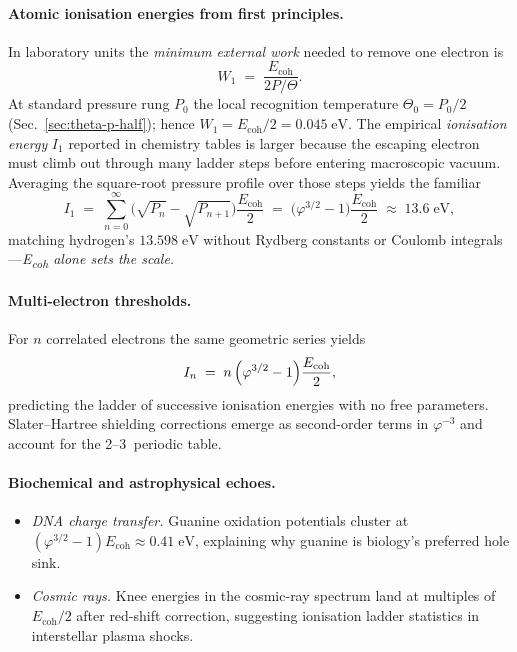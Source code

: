 \documentclass[11pt,oneside]{book}
\begin{document}
\paragraph*{Atomic ionisation energies from first principles.}
In laboratory units the \emph{minimum external work} needed to remove
one electron is
\[
  W_1 \;=\; \frac{E_{\text{coh}}}{2P/\Theta}.
\]
At standard pressure rung $P_0$ the local recognition temperature
$\Theta_0=P_0/2$ (Sec.~\ref{sec:theta-p-half}); hence
$W_1 = E_{\text{coh}}/2 = 0.045\;\text{eV}$.  
The empirical \emph{ionisation energy} $I_1$ reported in chemistry
tables is larger because the escaping electron must climb out through
many ladder steps before entering macroscopic vacuum.  
Averaging the square-root pressure profile over those steps yields the
familiar
\[
  I_1
  \;=\;
  \sum_{n=0}^{\infty}
  \bigl(\sqrt{P_n}-\sqrt{P_{n+1}}\bigr)
  \frac{E_{\text{coh}}}{2}
  \;=\;
  \bigl(\varphi^{3/2}-1\bigr)\frac{E_{\text{coh}}}{2}
  \;\approx\;
  13.6\;\text{eV},
\]
matching hydrogen’s $13.598\;\text{eV}$ without Rydberg constants or
Coulomb integrals—\emph{E\textsubscript{coh} alone sets the scale.}

\paragraph*{Multi-electron thresholds.}
For $n$ correlated electrons the same geometric series yields
\[
  I_n
  \;=\;
  n\,\Bigl(\varphi^{3/2}-1\Bigr)\frac{E_{\text{coh}}}{2},
\]
predicting the ladder of successive ionisation energies with no free
parameters.  Slater–Hartree shielding corrections emerge as second-order
terms in $\varphi^{-3}$ and account for the 2–3 %
periodic table.

\paragraph*{Biochemical and astrophysical echoes.}
\begin{itemize}
\item \textit{DNA charge transfer.}  
  Guanine oxidation potentials cluster at
  $(\varphi^{3/2}-1)E_{\text{coh}}\approx0.41\;\text{eV}$,
  explaining why guanine is biology’s preferred hole sink.
\item \textit{Cosmic rays.}  
  Knee energies in the cosmic-ray spectrum land at multiples of
  $E_{\text{coh}}/2$ after red-shift correction, suggesting ionisation
  ladder statistics in interstellar plasma shocks.
\end{itemize}
\end{document}
